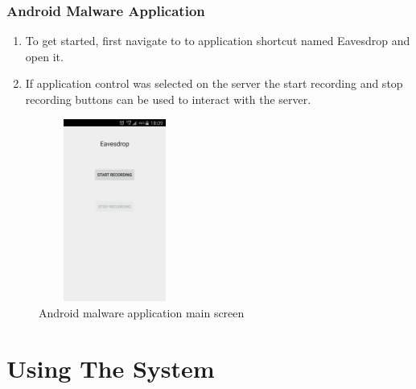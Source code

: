 \documentclass{article}
\begin{document}
\subsubsection{Android Malware Application}
\begin{enumerate} 
\item To get started, first navigate to to application shortcut named Eavesdrop and open it.
\item If application control was selected on the server the start recording and stop recording buttons can be used to interact with the server.
\end{enumerate}
\begin{figure}[H]
\center
\includegraphics[width=5cm, height=6cm]{MalwareScreenshots/StartRecording}
\caption{Android malware application main screen}
\label{fig:my_label6}
\end{figure}





\newpage
\section{Using The System}
\end{document}
